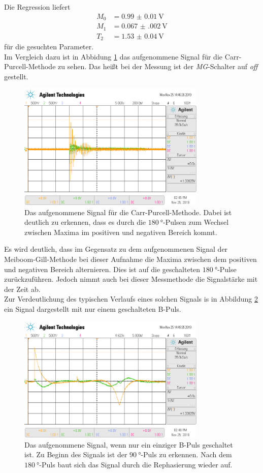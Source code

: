 Die Regression liefert
\begin{align}
  M_0 &=  \SI{0.99(001)}{\volt} \\
  M_1 &=  \SI{0.067(002)}{\volt} \\
  T_2 &=  \SI{1.53(004)}{\volt}
\end{align}
für die gesuchten Parameter. \\
Im Vergleich dazu ist in Abbidung \ref{fig:t2_off} das aufgenommene Signal für die Carr-Purcell-Methode zu sehen. Das heißt bei der 
Messung ist der \textit{MG}-Schalter auf \textit{off} gestellt.
\begin{figure}[H]
  \centering
  \includegraphics[width=0.8\textwidth]{../data/scope_76.png}
  \caption{Das aufgenommene Signal für die Carr-Purcell-Methode. Dabei ist deutlich zu erkennen, dass es durch die 
  $\SI{180}{\degree}$-Pulsen zum Wechsel zwischen Maxima im positiven und negativen Bereich kommt.}
  \label{fig:t2_off}
\end{figure} \noindent
Es wird deutlich, dass im Gegensatz zu dem aufgenommenen Signal der Meiboom-Gill-Methode bei dieser Aufnahme die Maxima zwischen
dem positiven und negativen Bereich alternieren. Dies ist auf die geschalteten $\SI{180}{\degree}$-Pulse zurückzuführen. Jedoch
nimmt auch bei dieser Messmethode die Signalstärke mit der Zeit ab. \\
Zur Verdeutlichung des typischen Verlaufs eines solchen Signals is in Abbildung \ref{fig:N1} ein Signal dargestellt mit nur einem
geschalteten B-Puls.
\begin{figure}[H]
  \centering
  \includegraphics[width=0.8\textwidth]{../data/scope_77.png}
  \caption{Das aufgenommene Signal, wenn nur ein einziger B-Puls geschaltet ist. Zu Beginn des Signals ist der 
  $\SI{90}{\degree}$-Puls zu erkennen. Nach dem $\SI{180}{\degree}$-Puls baut sich das Signal durch die Rephasierung 
  wieder auf.}
  \label{fig:N1}
\end{figure} \noindent
